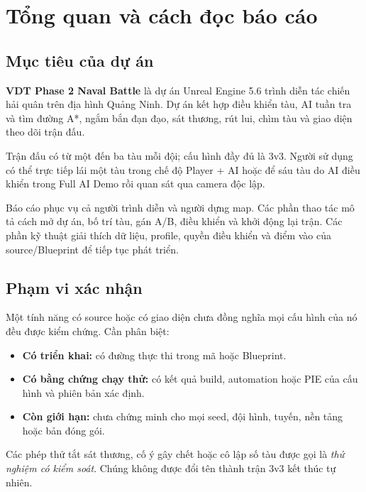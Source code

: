 
\chapter{Tổng quan và cách đọc báo cáo}
\label{chap:tongquan}

\section{Mục tiêu của dự án}
\textbf{VDT Phase 2 Naval Battle} là dự án Unreal Engine 5.6 trình diễn tác chiến hải quân trên địa hình Quảng Ninh. Dự án kết hợp điều khiển tàu, AI tuần tra và tìm đường A*, ngắm bắn đạn đạo, sát thương, rút lui, chìm tàu và giao diện theo dõi trận đấu.

Trận đấu có từ một đến ba tàu mỗi đội; cấu hình đầy đủ là 3v3. Người sử dụng có thể trực tiếp lái một tàu trong chế độ Player + AI hoặc để sáu tàu do AI điều khiển trong Full AI Demo rồi quan sát qua camera độc lập.

Báo cáo phục vụ cả người trình diễn và người dựng map. Các phần thao tác mô tả cách mở dự án, bố trí tàu, gán A/B, điều khiển và khởi động lại trận. Các phần kỹ thuật giải thích dữ liệu, profile, quyền điều khiển và điểm vào của source/Blueprint để tiếp tục phát triển.

\section{Phạm vi xác nhận}
Một tính năng có source hoặc có giao diện chưa đồng nghĩa mọi cấu hình của nó đều được kiểm chứng. Cần phân biệt:
\begin{itemize}
 \item \textbf{Có triển khai:} có đường thực thi trong mã hoặc Blueprint.
 \item \textbf{Có bằng chứng chạy thử:} có kết quả build, automation hoặc PIE của cấu hình và phiên bản xác định.
 \item \textbf{Còn giới hạn:} chưa chứng minh cho mọi seed, đội hình, tuyến, nền tảng hoặc bản đóng gói.
\end{itemize}
Các phép thử tắt sát thương, cố ý gây chết hoặc cô lập số tàu được gọi là \emph{thử nghiệm có kiểm soát}. Chúng không được đổi tên thành trận 3v3 kết thúc tự nhiên.

